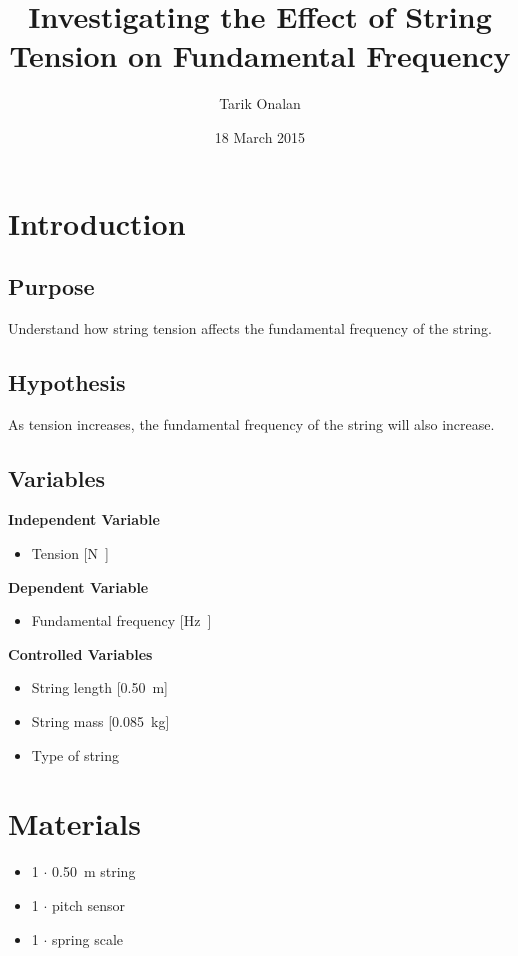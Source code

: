 \documentclass[a4paper]{article}
\title{Investigating the Effect of String Tension on Fundamental Frequency}
\date{18 March 2015}
\author{Tarik Onalan}
\begin{document}
    \maketitle
    \section{Introduction}
        \subsection{Purpose}
            Understand how string tension affects the fundamental frequency of the
            string.
        \subsection{Hypothesis}
            As tension increases, the fundamental frequency of the string will also
            increase.
        \subsection{Variables}
            \textbf{Independent Variable}
            \begin{itemize}
                \item Tension [\si\N]
            \end{itemize}
            \textbf{Dependent Variable}
            \begin{itemize}
                \item Fundamental frequency [\si\hertz]
            \end{itemize}
            \textbf{Controlled Variables}
            \begin{itemize}
                \item String length [\SI{0.50}{\m}]
                \item String mass [\SI{0.085}{\kg}]
                \item Type of string
            \end{itemize}
    \section{Materials}
        \begin{itemize}
            \item 1 $\cdot$ \SI{0.50}{\m} string
            \item 1 $\cdot$ pitch sensor
            \item 1 $\cdot$ spring scale
        \end{itemize}
\end{document}
